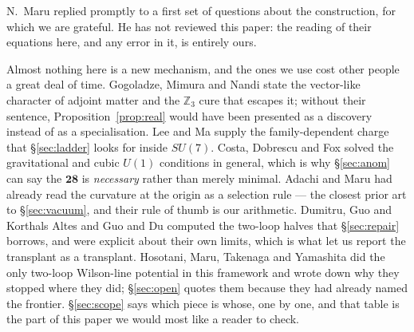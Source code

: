\documentclass[11pt,a4paper]{article}
\newcommand{\ZZ}{\mathbb{Z}}
\newcommand{\su}[1]{SU(#1)}
\newcommand{\rep}[1]{\mathbf{#1}}
\begin{document}
N.~Maru replied promptly to a first set of questions about the construction, for which we are
grateful. He has not reviewed this paper: the reading of their equations here, and any error in it,
is entirely ours.

Almost nothing here is a new mechanism, and the ones we use cost other people a great deal of time.
Gogoladze, Mimura and Nandi \cite{GMN} state the vector-like character of adjoint matter and the
$\ZZ_3$ cure that escapes it; without their sentence, Proposition~\ref{prop:real} would have been
presented as a discovery instead of as a specialisation. Lee and Ma \cite{FamilyU1} supply the
family-dependent charge that \S\ref{sec:ladder} looks for inside $\su7$. Costa, Dobrescu and Fox
\cite{CDF} solved the gravitational and cubic $U(1)$ conditions in general, which is why \S\ref{sec:anom}
can say the $\rep{28}$ is \emph{necessary} rather than merely minimal. Adachi and Maru \cite{AdachiMaru}
had already read the curvature at the origin as a selection rule --- the closest prior art to
\S\ref{sec:vacuum}, and their rule of thumb is our arithmetic. Dumitru, Guo and Korthals Altes
\cite{DGKA} and Guo and Du \cite{GuoDu} computed the two-loop halves that \S\ref{sec:repair} borrows,
and were explicit about their own limits, which is what let us report the transplant as a transplant.
Hosotani, Maru, Takenaga and Yamashita \cite{HMTY} did the only two-loop Wilson-line potential in this
framework and wrote down why they stopped where they did; \S\ref{sec:open} quotes them because they
had already named the frontier. \S\ref{sec:scope} says which piece is whose, one by one, and that
table is the part of this paper we would most like a reader to check.
\end{document}
